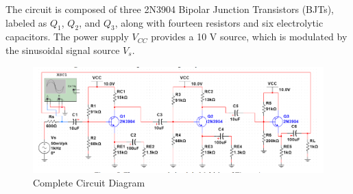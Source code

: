 
{The circuit is composed of three 2N3904 Bipolar Junction Transistors (BJTs), labeled as \( Q_1 \), \( Q_2 \), and \( Q_3 \), along with fourteen resistors and six electrolytic capacitors. The power supply \( V_{CC} \) provides a 10 V source, which is modulated by the sinusoidal signal source \( V_s \).}

{}

{}

\begin{figure}[H]
    \centering
    \includegraphics[width=16cm]{Pictures/Circuit.png}
    \caption{{Complete Circuit Diagram}}
    \label{circuit-dia}
\end{figure}
